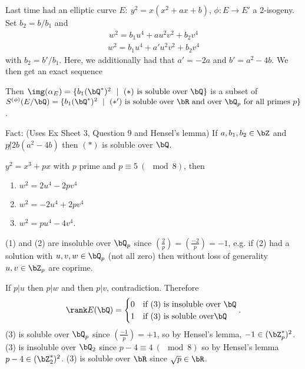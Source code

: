 Last time had an elliptic curve $E:~ y^2=x(x^2 + ax + b)$, $\phi:E \to E'$ a 2-isogeny. Set $b_2 = b/b_1$ and
\begin{align*}\tag{$\ast$}
	w^2 = b_1u^4 + au^2v^2 + b_2 v^4
\end{align*} 
\begin{align*}\tag{$\ast$'}
	w^2 = b_1u^4 + a'u^2v^2 + b_2 v^4
\end{align*}
with $b_2 = b'/b_1$. Here, we additionally had that $a' = -2a$ and $b' = a^2 - 4b$. We then get an exact sequence
\begin{center}
\end{center}
Then $\img(\alpha_E) = \{b_1(\bQ^*)^2 ~ \mid ~ (\ast) \text{ is soluble over } \bQ\}$ is a subset of $S^{(\phi)}(E/\bQ) = \{b_1(\bQ^*)^2 ~\mid~ (\ast') \text{ is soluble over }\bR \text{ and over  } \bQ_p \text{ for all primes } p\}$. 

Fact: (Uses Ex Sheet 3, Question 9 and Hensel's lemma) If $a, b_1, b_2 \in \bZ$ and $p\not | 2b(a^2 - 4b)$ then $(\ast)$ is soluble over $\bQ$.

\begin{example}
	$y^2 = x^3 + px$ with $p$ prime and $p \equiv 5~ (\mod 8)$, then 
	\begin{enumerate}[(1)]
		\item $w^2 = 2u^4 - 2pv^4$
		\item $w^2 = -2u^4 + 2pv^4$
		\item $w^2 = pu^4 - 4v^4$.
	\end{enumerate}
	(1) and (2) are insoluble over $\bQ_p$ since $\left(\frac{2}{p}\right) = \left(\frac{-2}{p}\right) = -1$, e.g. if (2) had a solution with $u,v,w \in \bQ_p$ (not all zero) then without loss of generality $u,v \in \bZ_p$ are coprime.

	If $p | u$ then $p | w$ and then $p | v$, contradiction. Therefore
	\begin{align*}
		\rank E(\bQ) =
		\begin{cases}
			0 & \text{if (3) is insoluble over } \bQ \\
			1 & \text{if (3) is soluble over} \bQ
		\end{cases}.
	\end{align*}
	(3) is soluble over $\bQ_p$ since $\left(\frac{-1}{p}\right) = + 1$, so by Hensel's lemma, $-1 \in (\bZ_p^*)^2$. (3) is insoluble over $\bQ_2$ since $p - 4 \equiv 4 ~ (\mod 8)$ so by Hensel's lemma $p - 4 \in (\bZ_2^*)^2$. (3) is soluble over $\bR$ since $\sqrt{p} \in \bR$.
\end{example}

